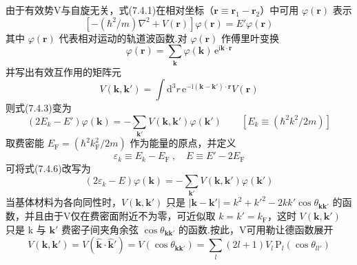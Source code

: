 由于有效势V与自旋无关，式(7.4.1)在相对坐标（$\boldsymbol{r}\equiv\boldsymbol{r}_{1}-\boldsymbol{r}_{2}$）中可用 $\varphi(\boldsymbol{r})$ 表示
\begin{equation}
  \left[-\left(\hbar^{2}/m\right)\nabla^{2}+V(\boldsymbol{r})\right]\varphi(\boldsymbol{r})=E'\varphi(\boldsymbol{r})
\end{equation}
其中 $\varphi(\boldsymbol{r})$ 代表相对运动的轨道波函数.对 $\varphi(\boldsymbol{r})$ 作傅里叶变换
\begin{equation}
  \varphi(\boldsymbol{r})=\sum_{\boldsymbol{k}}\varphi(\boldsymbol{k})\,\mathrm{e}^{\mathrm{i}\boldsymbol{k}\cdot\boldsymbol{r}}
\end{equation}
并写出有效互作用的矩阵元
\begin{equation}
  V\left(\boldsymbol{k},\boldsymbol{k}'\right)=\int\mathrm{d}^{3}r\,
  \mathrm{e}^{-\mathrm{i}\left(\boldsymbol{k}-\boldsymbol{k}'\right)\cdot\boldsymbol{r}}V(\boldsymbol{r})
\end{equation}
则式(7.4.3)变为
\begin{equation}
  \left(2E_{k}-E'\right)\varphi(\boldsymbol{k})=-\sum_{\boldsymbol{k}'}V\left(\boldsymbol{k},\boldsymbol{k}'\right)\varphi(\boldsymbol{k}')
  \qquad\left[E_{k}\equiv\left(\hbar^{2}k^{2}/2m\right)\right]
\end{equation}
取费密能 $E_{\mathrm{F}}=\left(\hbar^{2}k_{\mathrm{F}}^{2}/2m\right)$ 作为能量的原点，并定义
\begin{equation}
  \varepsilon_{k}\equiv E_{k}-E_{\mathrm{F}}\ ,\quad E\equiv E'-2E_{\mathrm{F}}
\end{equation}
可将式(7.4.6)改写为
\begin{equation}
  \left(2\varepsilon_{k}-E\right)\varphi(\boldsymbol{k})=-\sum_{\boldsymbol{k}'}V\left(\boldsymbol{k},\boldsymbol{k}'\right)\varphi(\boldsymbol{k}')
\end{equation}
当基体材料为各向同性时，$V\left(\boldsymbol{k},\boldsymbol{k}'\right)$ 只是 $\left|\boldsymbol{k}-\boldsymbol{k}'\right|=k^{2}+k'^{2}-2kk'\cos\theta_{\boldsymbol{k}\boldsymbol{k}'}$ 的函数，并且由于V仅在费密面附近不为零，可近似取 $k=k'=k_{\mathrm{F}}$，这时 $V\left(\boldsymbol{k},\boldsymbol{k}'\right)$ 只是 k 与 $\boldsymbol{k}'$ 费密子间夹角余弦 $\cos\theta_{\boldsymbol{k}\boldsymbol{k}'}$ 的函数.按此，V可用勒让德函数展开
\begin{equation}
  V\left(\boldsymbol{k},\boldsymbol{k}'\right)=V\left(\hat{\boldsymbol{k}}\cdot\hat{\boldsymbol{k}}'\right)
  =V\left(\cos\theta_{\boldsymbol{k}\boldsymbol{k}'}\right)
  =\sum_{l}\left(2l+1\right)V_{l}\,\mathrm{P}_{l}\left(\cos\theta_{ll'}\right)
\end{equation}
